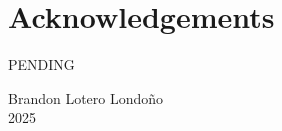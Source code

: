 \cleardoublepage
\chapter*{Acknowledgements}
PENDING

\begin{flushright}
  Brandon Lotero Londoño\\
  2025
\end{flushright}